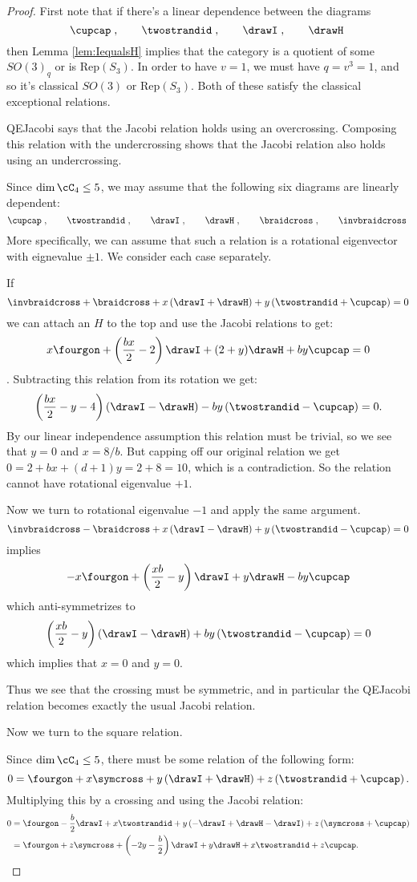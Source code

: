 \documentclass[12pt]{amsart}
\begin{document}
\begin{proof}
First note that if there's a linear dependence between the diagrams
 \[
  \cupcap\;,\qquad\twostrandid\;,
    \qquad\drawI\;,\qquad\drawH\; \]
then Lemma \ref{lem:IequalsH} implies that the category is a quotient of some $SO(3)_q$ or is $\mathrm{Rep}(S_3)$.  In order to have $v=1$, we must have $q = v^3 = 1$, and so it's classical $SO(3)$ or $\mathrm{Rep}(S_3)$.  Both of these satisfy the classical exceptional relations.

QEJacobi says that the Jacobi relation holds using an overcrossing.  Composing this relation with the undercrossing shows that the Jacobi relation also holds using an undercrossing.

Since $\dim \cC_4 \leq 5$, we may assume that the following six diagrams are linearly dependent:
 \[
  \cupcap\;,\qquad\twostrandid\;,
    \qquad\drawI\;,\qquad\drawH\;,\qquad\braidcross\;,\qquad \invbraidcross\;
   \]
More specifically, we can assume that such a relation is a rotational eigenvector with eignevalue $\pm 1$.  We consider each case separately.

If
\[\invbraidcross + \braidcross + x\left(\drawI + \drawH\right) + y \left(\twostrandid+\cupcap\right)=0\]
we can attach an $H$ to the top and use the Jacobi relations to get:
\[ x \fourgon +\left(\frac{bx}{2} -2\right) \drawI + (2+y)\drawH + b y \cupcap = 0\].
Subtracting this relation from its rotation we get:
\[\left(\frac{bx}{2} -y -4\right) \left(\drawI-\drawH\right) -b y \left(\twostrandid - \cupcap\right) = 0.\]
By our linear independence assumption this relation must be trivial, so we see that $y=0$ and $x = 8/b$.  But capping off our original relation we get $0 = 2+bx+(d+1)y = 2+8 = 10$, which is a contradiction.  So the relation cannot have rotational eigenvalue $+1$.

Now we turn to rotational eigenvalue $-1$ and apply the same argument.
\[\invbraidcross - \braidcross + x\left(\drawI - \drawH\right) + y \left(\twostrandid-\cupcap\right)=0\] implies
\[-x \fourgon + \left(\frac{xb}{2} -y\right) \drawI + y \drawH - b y \cupcap\] which anti-symmetrizes to
\[\left(\frac{xb}{2}-y\right) \left(\drawI - \drawH\right) + b y \left(\twostrandid - \cupcap\right) = 0\]
which implies that $x = 0$ and $y=0$.

Thus we see that the crossing must be symmetric, and in particular the QEJacobi relation becomes exactly the usual Jacobi relation.

Now we turn to the square relation.

Since $\dim \cC_4 \leq 5$, there must be some relation of the following form:
$$0 = \fourgon + x \symcross + y \left(\drawI + \drawH \right) + z\left(\twostrandid + \cupcap \right).$$
Multiplying this by a crossing and using the Jacobi relation:
\begin{align*}
0 &= \fourgon - \frac{b}{2} \drawI + x \twostrandid + y \left(-\drawI + \drawH -\drawI \right) + z\left(\symcross + \cupcap \right) 
\\ &= \fourgon + z \symcross + \left(-2y -\frac{b}{2} \right) \drawI +y \drawH +x \twostrandid + z\cupcap. 
\end{align*}


\end{proof}
\end{document}
